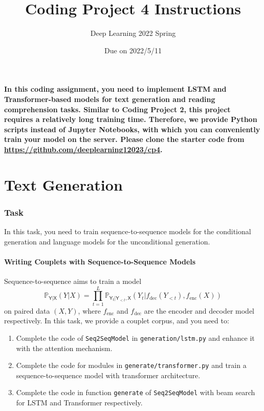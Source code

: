 \documentclass{article}
\title{Coding Project 4 Instructions}
\author{Deep Learning 2022 Spring}
\date{Due on 2022/5/11}
\newcommand{\rv}[1]{\mathsf{#1}}
\begin{document}
\maketitle

\noindent\textbf{
In this coding assignment, you need to implement LSTM and Transformer-based models for text generation and reading comprehension tasks. Similar to Coding Project 2, this project requires a relatively long training time. Therefore, we provide Python scripts instead of Jupyter Notebooks, with which you can conveniently train your model on the server. Please clone the starter code from
\url{https://github.com/deeplearning12023/cp4}.
}

\part{Text Generation}

\section{Task}

In this task, you need to train sequence-to-sequence models for the conditional generation and language models for the unconditional generation.

\subsection{Writing Couplets with Sequence-to-Sequence Models}
Sequence-to-sequence aims to train a model
\begin{equation*}
    \mathbb{P}_{\rv{Y}|\rv{X}}(Y|X)=\prod_{t=1}^L \mathbb{P}_{\rv{Y_t}|\rv{Y}_{<t},\rv{X}}
    (Y_t|f_\textrm{dec}(Y_{<t}),f_\textrm{enc}(X))
\end{equation*}
on paired data $(X,Y)$, where $f_\textrm{enc}$ and $f_\textrm{dec}$ are the encoder and decoder model respectively. In this task, we provide a couplet corpus, and you need to:
\begin{enumerate}
    \item Complete the code of \texttt{Seq2SeqModel} in \texttt{generation/lstm.py} and enhance it with the attention mechanism.
    \item
    Complete the code for modules in \texttt{generate/transformer.py} and train a sequence-to-sequence model with transformer architecture.
    \item
    Complete the code in function \texttt{generate} of \texttt{Seq2SeqModel} with beam search for LSTM and Transformer respectively.
\end{enumerate}
\end{document}
